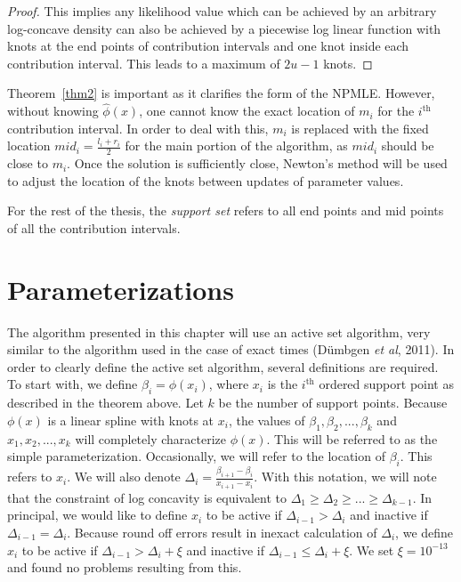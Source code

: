 \documentclass[10pt]{article}
\begin{document}
\begin{proof}
	This implies any likelihood value which can be achieved by an arbitrary log-concave density can also be achieved by a piecewise log linear function with knots at the end points of contribution intervals and one knot inside each contribution interval. This leads to a maximum of $2u-1$ knots.
	\end{proof}
	
	Theorem~\ref{thm2} is important as it clarifies the form of the NPMLE.  However, without knowing $\hat\phi(x)$, one cannot know the exact location of $m_i$ for the $i^{\mathrm{th} } $ contribution interval. In order to deal with this, $m_i$ is replaced with the fixed location $mid_i = \frac{l_i + r_i}{2}$ for the main portion of the algorithm, as $mid_i$ should be close to $m_i$. Once the solution is sufficiently close, Newton's method will be used to adjust the location of the knots between updates of parameter values. 
		
	For the rest of the thesis, the {\it support set} refers to all end points and mid points of all the contribution intervals.

	{\section{Parameterizations} }
	
	The algorithm presented in this chapter will use an active set algorithm, very similar to the algorithm used in the case of exact times (D\"umbgen \emph{et al}, 2011). In order to clearly define the active set algorithm, several definitions are required. To start with, we define $\beta_i = \phi(x_i)$, where $x_i$ is the $i^{\mathrm{th} } $ ordered support point as described in the theorem above. Let $k$ be the number of support points. Because $\phi(x)$ is a linear spline with knots at $x_i$, the values of $\beta_1, \beta_2, ..., \beta_k$ and $x_1, x_2, ..., x_k$ will completely characterize $\phi(x)$. This will be referred to as the simple parameterization. Occasionally, we will refer to the location of $\beta_i$. This refers to $x_i$. We will also denote $\Delta_i = \frac{\beta_{i+1} - \beta_i} {x_{i+1} - x_i}$. With this notation, we will note that the constraint of log concavity is equivalent to $\Delta_1 \geq \Delta_2 \geq ... \geq \Delta_{k-1}$. In principal, we would like to define $x_i$ to be active if $\Delta_{i-1} > \Delta_i$ and inactive if $\Delta_{i-1} = \Delta_i$. Because round off errors result in inexact calculation of $\Delta_i$, we define $x_i$ to be active if $\Delta_{i-1} > \Delta_i + \xi$ and inactive if $\Delta_{i-1} \leq \Delta_i + \xi$.  We set $\xi = 10^{-13}$ and found no problems resulting from this. 
	
\end{document}
